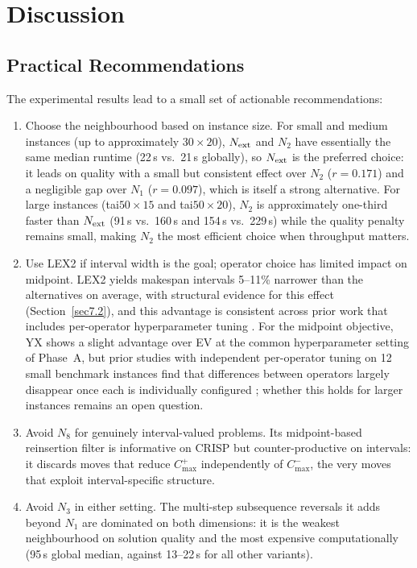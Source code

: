 \documentclass[preprint,12pt]{elsarticle}
\begin{document}
\section{Discussion}
\label{sec7}

\subsection{Practical Recommendations}
\label{sec7.1}

The experimental results lead to a small set of actionable recommendations:
\begin{enumerate}
\item Choose the neighbourhood based on instance size. For small and medium instances (up to approximately $30{\times}20$), $N_{\rm ext}$ and $N_2$ have essentially the same median runtime (22\,s vs.\ 21\,s globally), so $N_{\rm ext}$ is the preferred choice: it leads on quality with a small but consistent effect over $N_2$ ($r = 0.171$) and a negligible gap over $N_1$ ($r = 0.097$), which is itself a strong alternative. For large instances (tai$50{\times}15$ and tai$50{\times}20$), $N_2$ is approximately one-third faster than $N_{\rm ext}$ (91\,s vs.\ 160\,s and 154\,s vs.\ 229\,s) while the quality penalty remains small, making $N_2$ the most efficient choice when throughput matters.
\item Use LEX2 if interval width is the goal; operator choice has limited impact on midpoint. LEX2 yields makespan intervals 5--11\% narrower than the alternatives on average, with structural evidence for this effect (Section~\ref{sec7.2}), and this advantage is consistent across prior work that includes per-operator hyperparameter tuning \cite{DiazICAE2023,DiazIGPL2022}. For the midpoint objective, YX shows a slight advantage over EV at the common hyperparameter setting of Phase~A, but prior studies with independent per-operator tuning on 12 small benchmark instances find that differences between operators largely disappear once each is individually configured \cite{DiazICAE2023,DiazIGPL2022}; whether this holds for larger instances remains an open question.
\item Avoid $N_8$ for genuinely interval-valued problems. Its midpoint-based reinsertion filter is informative on CRISP but counter-productive on intervals: it discards moves that reduce $C^+_{\max}$ independently of $C^-_{\max}$, the very moves that exploit interval-specific structure.
\item Avoid $N_3$ in either setting. The multi-step subsequence reversals it adds beyond $N_1$ are dominated on both dimensions: it is the weakest neighbourhood on solution quality and the most expensive computationally (95\,s global median, against 13--22\,s for all other variants).
\end{enumerate}
\end{document}
